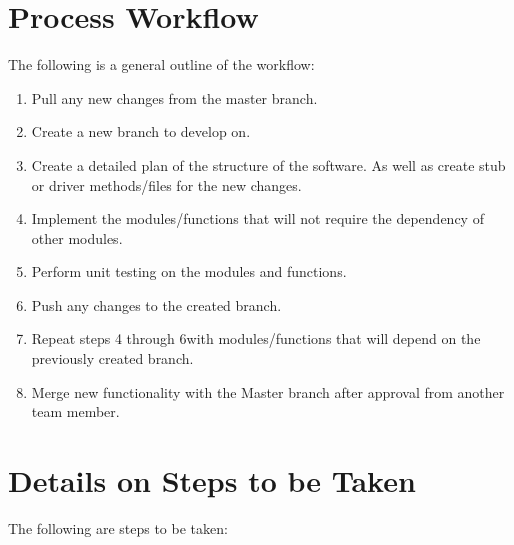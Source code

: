 \documentclass [10pt]{article}
\begin{document}
\section{Process Workflow}
The following is a general outline of the workflow: 

	\begin{enumerate}
		\item Pull any new changes from the master branch.
		\item Create a new branch to develop on.
		\item Create a detailed plan of the structure of the software. As well as create stub or driver methods/files for the new changes.
		\item Implement the modules/functions that will not require the dependency of other modules.
		\item Perform unit testing on the modules and functions.
		\item Push any changes to the created branch.
		\item Repeat steps 4 through 6with modules/functions that will depend on the previously created branch.
		\item Merge new functionality with the Master branch after approval from another team member.
	\end{enumerate}



\section{Details on Steps to be Taken}
The following are steps to be taken:
\end{document}
